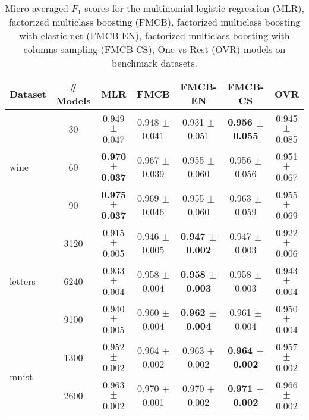 \documentclass{standalone}
\begin{document}



\begin{table*}%
\label{exp-results}
\centering
\caption{Micro-averaged $F_{1}$ scores for the multinomial logistic regression (MLR), factorized multiclass boosting (FMCB), factorized multiclass boosting with elastic-net (FMCB-EN), factorized multiclass boosting with columns sampling (FMCB-CS), One-vs-Rest (OVR) models on benchmark datasets.}
\vskip 0.15in
\begin{small}
\begin{sc}
{\renewcommand{\arraystretch}{1.2}%
\begin{tabular}{|l|c|c|c|c|c|c|}
\hline
\abovespace\belowspace
Dataset		& \# Models 	& MLR & FMCB & FMCB-EN 	& FMCB-CS & OVR  \\
\hline\hline
\multirow{3}{*}{wine}
	& 30    		& 0.949 $\pm$ 0.047 		 & 0.948 $\pm$ 0.041 & 0.931 $\pm$ 0.051 & \textbf{0.956 $\pm$ 0.055} & 0.945 $\pm$ 0.085\\
	& 60	  		& \textbf{0.970 $\pm$ 0.037} & 0.967 $\pm$ 0.039 & 0.955 $\pm$ 0.060 & 0.956 $\pm$ 0.056 & 0.951 $\pm$ 0.067\\
	& 90    		& \textbf{0.975 $\pm$ 0.037} & 0.969 $\pm$ 0.046 & 0.955 $\pm$ 0.060 & 0.963 $\pm$ 0.059 & 0.955 $\pm$ 0.069\\
\hline
\multirow{3}{*}{letters}
	& 3120			& 0.915 $\pm$ 0.005 & 0.946 $\pm$ 0.005 & \textbf{0.947 $\pm$ 0.002} & 0.947 $\pm$ 0.003 & 0.922 $\pm$ 0.006\\
	& 6240	 		& 0.933 $\pm$ 0.004 & 0.958 $\pm$ 0.004 & \textbf{0.958 $\pm$ 0.003} & 0.958 $\pm$ 0.003 & 0.943 $\pm$ 0.004\\
	& 9100 			& 0.940 $\pm$ 0.005 & 0.960 $\pm$ 0.004 & \textbf{0.962 $\pm$ 0.004} & 0.961 $\pm$ 0.004 & 0.950 $\pm$ 0.004\\
\hline
\multirow{3}{*}{mnist}
	& 1300			& 0.952 $\pm$ 0.002 & 0.964 $\pm$ 0.002 			& 0.963 $\pm$ 0.002 			& \textbf{0.964 $\pm$ 0.002} & 0.957 $\pm$ 0.002\\
	& 2600			& 0.963 $\pm$ 0.002 & 0.970 $\pm$ 0.001 	& 0.970 $\pm$ 0.002 			& \textbf{0.971 $\pm$ 0.002} & 0.966 $\pm$ 0.002\\

\end{tabular}}
\end{sc}
\end{small}
\end{table*}
\end{document}
